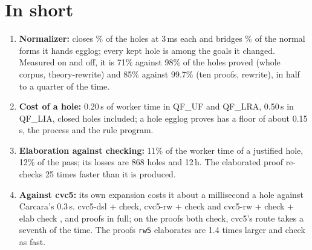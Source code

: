 \documentclass[11pt,a4paper]{article}
\newcommand{\UF}{QF\_UF}
\newcommand{\LIA}{QF\_LIA}
\newcommand{\LRA}{QF\_LRA}
\newcommand{\code}[1]{\texttt{#1}}
\begin{document}
\section{In short}

\begin{enumerate}
  \item \textbf{Normalizer:} closes \closedshare\% of the holes at 3\,ms each
    and bridges \bridgedshare\% of the normal forms it hands egglog; every
    kept hole is among the goals it changed. Measured on and off, it is
    71\% against 98\% of the holes proved (whole corpus, theory-rewrite) and
    85\% against 99.7\% (ten proofs, rewrite), in half to a quarter of the
    time.
  \item \textbf{Cost of a hole:} 0.20\,s of worker time in \UF{} and \LRA{},
    0.50\,s in \LIA{}, closed holes included; a hole egglog proves has a
    floor of about 0.15\,s, the process and the rule program.
  \item \textbf{Elaboration against checking:} 11\% of the worker time of a
    justified hole, 12\% of the pass; its losses are 868 holes and 12\,h.
    The elaborated proof re-checks 25 times faster than it is produced.
  \item \textbf{Against cvc5:} its own expansion costs it about a
    millisecond a hole against Carcara's 0.3\,s. cvc5-dsl + check,
    cvc5-rw + check and cvc5-rw + check + elab check \dslvalid{}, \checkfull{}
    and \rwvalid{} proofs in full; on the proofs both check, cvc5's route
    takes a seventh of the time. The proofs \code{rw5} elaborates are 1.4
    times larger and check as fast.
\end{enumerate}
\end{document}
